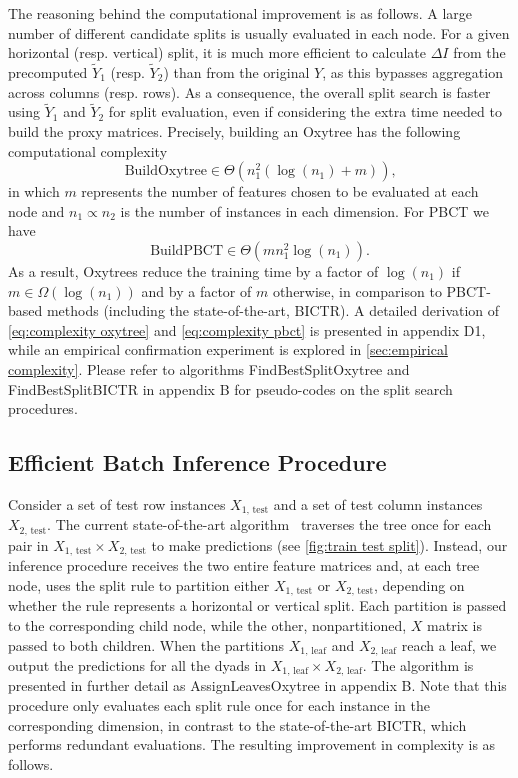 \documentclass[letterpaper]{article}
\begin{document}
The reasoning behind the computational improvement is as follows. A large number of different candidate splits is usually evaluated in each node. For a given horizontal (resp. vertical) split, it is much more efficient to calculate $\Delta I$ from the precomputed $\tilde Y_1$ (resp. $\tilde Y_2$) than from the original $Y$, as this bypasses aggregation across columns (resp. rows).
As a consequence, the overall split search is faster using $\tilde Y_1$ and $\tilde Y_2$ for split evaluation, even if considering the extra time needed to build the proxy matrices.
Precisely, building an Oxytree has
the following computational complexity
\begin{equation}
    \label{eq:complexity oxytree}
    \text{BuildOxytree} \in \Theta(n_1^2 (\log (n_1) + m))
    \text{,}
\end{equation}
in which $m$ represents the number of features chosen to be evaluated at each node and $n_1 \propto n_2$ is the number of instances in each dimension. For PBCT we have
\begin{equation}
    \label{eq:complexity pbct}
    \text{BuildPBCT} \in \Theta(m n_1^2 \log (n_1))
    \text{.}
\end{equation}
As a result, Oxytrees reduce the training time by a factor of $\log (n_1)$  if $m \in \Omega(\log (n_1))$ and by a factor of $m$ otherwise, in comparison to PBCT-based methods (including the state-of-the-art, BICTR). A detailed derivation of \cref{eq:complexity oxytree} and \cref{eq:complexity pbct} is presented in
appendix D1,
while an empirical confirmation experiment is explored in \cref{sec:empirical complexity}.
Please refer to algorithms
FindBestSplitOxytree and FindBestSplitBICTR in appendix B
for pseudo-codes on the split search procedures.


\subsection{Efficient Batch Inference Procedure}
\label{sec:batch inference}

Consider a set of test row instances $X_\text{1, test}$ and a set of test column instances $X_\text{2, test}$.
The current state-of-the-art algorithm~\cite{pliakos_global_2018} traverses the tree once for each pair in $X_\text{1, test} \times X_\text{2, test}$ to make predictions (see \cref{fig:train test split}). Instead, our inference procedure receives the two entire feature matrices and, at each tree node, uses the split rule to partition either $X_\text{1, test}$ or $X_\text{2, test}$, depending on whether the rule represents a horizontal or vertical split. Each partition is passed to the corresponding child node, while the other, nonpartitioned, $X$ matrix is passed to both children. When the partitions $X_\text{1, leaf}$ and $X_\text{2, leaf}$ reach a leaf, we output the predictions for all the dyads in $X_\text{1, leaf} \times X_\text{2, leaf}$.
The algorithm is presented in further detail as
AssignLeavesOxytree
in appendix B.
Note that this procedure only evaluates each split rule once for each instance in the corresponding dimension, in contrast to the state-of-the-art BICTR, which performs redundant evaluations.
The resulting improvement in complexity is as follows.
\end{document}
